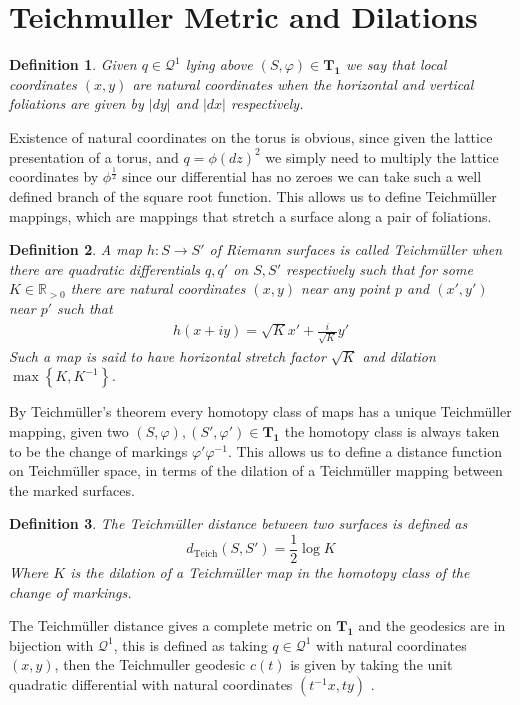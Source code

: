 \documentclass{article}
\newtheorem{defn}{Definition}
\newcommand{\set}[1]{\left\{#1\right\}}
\newcommand{\abs}[1]{\left\vert#1\right\vert}
\begin{document}
        \section{Teichmuller Metric and Dilations}
        \begin{defn}
            Given \(q \in \mathcal{Q}^1\) lying above \((S,\varphi) \in \mathbf{T_1}\) we say that local coordinates \((x,y)\) are natural coordinates when the horizontal and vertical foliations are given by \(\abs{dy}\) and \(\abs{dx}\) respectively.
        \end{defn}
        Existence of natural coordinates on the torus is obvious, since given the lattice presentation of a torus, and \(q = \phi(dz)^2\) we simply need to multiply the lattice coordinates by \(\phi^{\frac12}\) since our differential has no zeroes we can take such a well defined branch of the square root function. This allows us to define Teichm\"uller mappings, which are mappings that stretch a surface along a pair of foliations.
        \begin{defn}
            A map \(h: S \to S'\) of Riemann surfaces is called Teichm\"uller when there are quadratic differentials \(q, q'\) on \(S,S'\) respectively such that for some \(K \in \mathbb{R}_{>0}\) there are natural coordinates \((x,y)\) near any point \(p\) and \((x',y')\) near \(p'\) such that
            \begin{align*}
                h(x + iy) = \sqrt{K}x' + \frac{i}{\sqrt{K}}y'
            \end{align*}
            Such a map is said to have horizontal stretch factor \(\sqrt{K}\) and dilation \(\max\set{K,K^{-1}}\).
        \end{defn}
        By Teichm\"uller's theorem \cite{FarbMarg} every homotopy class of maps has a unique Teichm\"uller mapping, given two \((S,\varphi),(S',\varphi') \in \mathbf{T_1}\) the homotopy class is always taken to be the change of markings \(\varphi'\varphi^{-1}\). This allows us to define a distance function on Teichm\"uller space, in terms of the dilation of a Teichm\"uller mapping between the marked surfaces.
        \begin{defn}
            The Teichm\"uller distance between two surfaces is defined as \[d_{\operatorname{Teich}}(S,S') = \frac12 \log K\]
            Where \(K\) is the dilation of a Teichm\"uller map in the homotopy class of the change of markings.
        \end{defn}
        The Teichm\"uller distance gives a complete metric on \(\mathbf{T_1}\) and the geodesics are in bijection with \(\mathcal{Q}^1\), this is defined as taking \(q \in \mathcal{Q}^1\) with natural coordinates \((x,y)\), then the Teichmuller geodesic \(c(t)\) is given by taking the unit quadratic differential with natural coordinates \((t^{-1}x,ty)\) \cite{FarbMarg}. 
        
\end{document}
